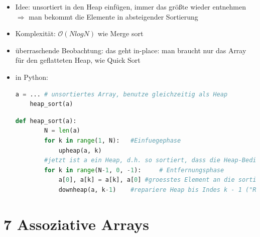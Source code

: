 \documentclass[11pt, fleqn]{scrreprt}
\begin{document}
\begin{itemize}
		\begin{itemize}
			\item Idee: unsortiert in den Heap einfügen, immer das größte wieder entnehmen\\
			$\Rightarrow$ man bekommt die Elemente in absteigender Sortierung
			\item Komplexität: $\mathcal{O}(N log N)$ wie Merge sort
			\item überraschende Beobachtung: das geht in-place: man braucht nur das Array für den geflatteten Heap, wie Quick Sort
			\item in Python:
			\begin{lstlisting}[language=Python]
	a = ... # unsortiertes Array, benutze gleichzeitig als Heap
	heap_sort(a)
			\end{lstlisting}
			\begin{lstlisting}[language=Python]
	def heap_sort(a):
		N = len(a)
		for k in range(1, N): 	#Einfuegephase
			upheap(a, k)
		#jetzt ist a ein Heap, d.h. so sortiert, dass die Heap-Bedingung gilt
		for k in range(N-1, 0, -1):		# Entfernungsphase
			a[0], a[k] = a[k], a[0]	#groesstes Element an die sortierte Position bringen
			downheap(a, k-1)	#repariere Heap bis Indes k - 1 ("Restheap")
			\end{lstlisting}
		\end{itemize}
\end{itemize}

\chapter*{7 Assoziative Arrays}
\end{document}
